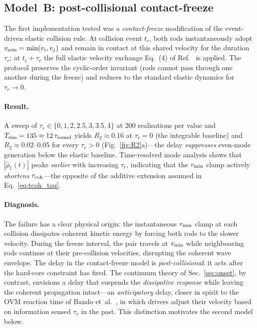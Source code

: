 \documentclass[aps,pre,twocolumn,superscriptaddress,longbibliography,floatfix]{revtex4-2}
\begin{document}
\subsection{Model~B: post-collisional contact-freeze}
\label{sec:modelB}

The first implementation tested was a \emph{contact-freeze}
modification of the event-driven elastic collision rule.
At collision event $t_c$, both rods instantaneously adopt
$v_{\rm min}=\min(v_i, v_j)$ and remain in contact at this
shared velocity for the duration $\tau_r$; at
$t_c+\tau_r$ the full elastic velocity exchange
Eq.~(4) of Ref.~\cite{PaperIV} is applied. The protocol
preserves the cyclic-order invariant (rods cannot pass
through one another during the freeze) and reduces to the
standard elastic dynamics for $\tau_r\to 0$.

\paragraph*{Result.}
A sweep of $\tau_r\in\{0, 1, 2, 2.5, 3, 3.5, 4\}$ at 200
realisations per value and $T_{\rm sim}=135\approx 12\,
\tau_{\rm sound}$ yields $R_2\approx 0.16$ at
$\tau_r=0$ (the integrable baseline) and
$R_2\approx 0.02$--$0.05$ for every $\tau_r>0$
(Fig.~\ref{fig:R2}a)---the delay \emph{suppresses}
even-mode generation below the elastic baseline.
Time-resolved mode analysis shows that $|\hat\rho_1(t)|$
peaks \emph{earlier} with increasing $\tau_r$, indicating
that the $v_{\rm min}$ clamp actively \emph{shortens}
$\tau_{\rm coh}$---the opposite of the additive extension
assumed in Eq.~\eqref{eq:tcoh_tau}.

\paragraph*{Diagnosis.}
The failure has a clear physical origin: the instantaneous
$v_{\rm min}$ clamp at each collision dissipates coherent
kinetic energy by forcing both rods to the slower velocity.
During the freeze interval, the pair travels at $v_{\rm min}$
while neighbouring rods continue at their pre-collision
velocities, disrupting the coherent wave envelope. The delay
in the contact-freeze model is \emph{post-collisional}: it
acts after the hard-core constraint has fired. The continuum
theory of Sec.~\ref{sec:onset}, by contrast, envisions a
delay that suspends the \emph{dissipative response} while
leaving the coherent propagation intact---an
\emph{anticipatory} delay, closer in spirit to the
OVM reaction time of Bando et~al.~\cite{Bando1995}, in which
drivers adjust their velocity based on information sensed
$\tau_r$ in the past. This distinction motivates the second
model below.
\end{document}
